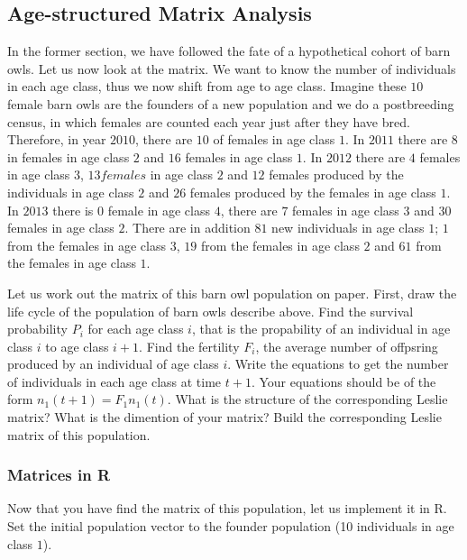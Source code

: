 \documentclass{article}\usepackage[]{graphicx}\usepackage[]{color}
\begin{document}
\subsection{Age-structured Matrix Analysis}
In the former section, we have followed the fate of a hypothetical cohort of barn owls. Let us now look at the matrix. We want to know the number of individuals in each age class, thus we now shift from age to age class. Imagine these $10$ female barn owls are the founders of a new population and we do a postbreeding census, in which females are counted each year just after they have bred. Therefore, in year $2010$, there are $10$ of females in age class $1$. In $2011$ there are $8$ in  females in age class $2$ and $16$ females in age class $1$.  In $2012$ there are $4$ females in age class $3$, $13 females$ in age class $2$ and $12$ females produced by the individuals in age class $2$ and $26$ females produced by the females in age class $1$. In $2013$ there is $0$ female in age class $4$, there are $7$ females in age class $3$ and $30$ females in age class $2$. There are in addition $81$ new individuals in age class $1$; $1$ from the females in age class $3$, $19$ from the females in age class $2$ and $61$ from the females in age class $1$.

\begin{Exercise}[title=Age-structured matix, label=ASM, difficulty=1]
\Question Let us work out the matrix of this barn owl population on paper.
\subQuestion First, draw the life cycle of the population of barn owls describe above.
\subQuestion Find the survival probability $P_i$ for each age class $i$, that is the propability of an individual in age class $i$ to age class $i+1$. 
\subQuestion Find the fertility $F_i$, the average number of offpsring produced by an individual of age class $i$.
\subQuestion Write the equations to get the number of individuals in each age class at time $t+1$. Your equations should be of the form $n_1(t+1)=F_1n_1(t)$.
\subQuestion What is the structure of the corresponding Leslie matrix? What is the dimention of your matrix?
\subQuestion Build the corresponding Leslie matrix of this population.
\end{Exercise}

\subsubsection{Matrices in R}
Now that you have find the matrix of this population, let us implement it in R. Set the initial population vector to the founder population (10 individuals in age class $1$). 
\end{document}
